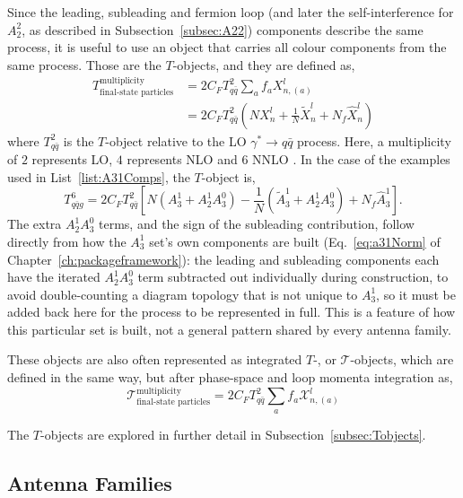 Since the leading, subleading and fermion loop (and later the self-interference
for $A_2^2$, as described in Subsection~\ref{subsec:A22}) components describe the 
same process, it is useful to use an object that carries all colour components 
from the same process. Those are the $T$-objects, and they are defined as,
\begin{equation}
    \begin{split}
        T_\text{final-state particles}^\text{multiplicity} &= 2C_FT_{q\bar q}^2\sum_a f_a X_{n,(a)}^l\\
                                                           &= 2C_FT_{q\bar q}^2\left(NX_n^l + \frac1N \tilde X_n^l + N_f \hat X_n^l\right)
    \end{split}
\end{equation}
where $T_{q\bar q}^2$ is the 
$T$-object relative to the LO $\gamma^*\to q\bar q$ process. Here, a multiplicity 
of $2$ represents LO, $4$ represents NLO and $6$ NNLO \cite{Gehrmann-DeRidder:2004ttg}. 
In the case of the examples used in List~\ref{list:A31Comps}, the $T$-object is,
\begin{equation}
    T^6_{q\bar qg} = 2C_FT_{q\bar q}^2\left[N\left(A_3^1+A_2^1A_3^0\right) - \frac1N\left(\tilde A_3^1+A_2^1A_3^0\right) + N_f\hat A_3^1\right].
\end{equation}
The extra $A_2^1A_3^0$ terms, and the sign of the subleading contribution, follow
directly from how the $A_3^1$ set's own components are built (Eq.~\eqref{eq:a31Norm}
of Chapter~\ref{ch:packageframework}): the leading and subleading components each
have the iterated $A_2^1A_3^0$ term subtracted out individually during construction,
to avoid double-counting a diagram topology that is not unique to $A_3^1$, so it
must be added back here for the process to be represented in full. This is a
feature of how this particular set is built, not a general pattern shared by
every antenna family.

These objects are also often represented as integrated $T$-, or 
$\mathcal T$-objects, which are defined in the same way, but after phase-space 
and loop momenta integration as,
\begin{equation}
    \mathcal T_\text{final-state particles}^\text{multiplicity} = 2C_FT_{q\bar q}^2\sum_a f_a \mathcal X_{n,(a)}^l
\end{equation}

The $T$-objects are explored in further detail in Subsection~\ref{subsec:Tobjects}.

\subsection{Antenna Families}\label{subsec:antFamilies}

